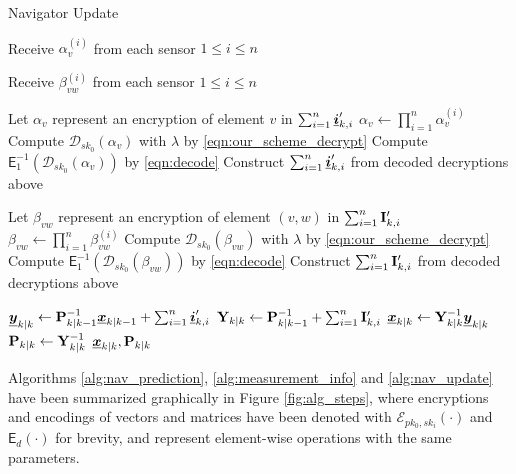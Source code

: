 \documentclass[10pt,letterpaper,oneside,twocolumn,journal]{IEEEtran}
\theoremstyle{definition}
\theoremstyle{definition}
\theoremstyle{remark}
\begin{document}
\begin{algorithm}[htbp]
\caption{Navigator Update}\label{alg:nav_update}
\begin{algorithmic}[1]
    
        \State Receive $\alpha_{v}^{(i)}$ from each sensor $1\leq i \leq n$
    \EndFor

        \State Receive $\beta_{vw}^{(i)}$ from each sensor $1\leq i \leq n$
        \EndFor
    \EndFor

    \State Let $\alpha_{v}$ represent an encryption of element $v$ in $\sum_{i=1}^n{\boldsymbol{\underline{i}}}'_{k,i}$
        \State $\alpha_{v} \gets \prod_{i=1}^n\alpha_{v}^{(i)}$
        \State Compute $\mathcal{D}_{sk_0}(\alpha_{v})$ with $\lambda$ by \eqref{eqn:our_scheme_decrypt}
        \State Compute $\mathsf{E}^{-1}_{1}(\mathcal{D}_{sk_0}(\alpha_{v}))$ by \eqref{eqn:decode}
    \EndFor
    \State Construct $\sum_{i=1}^n{\boldsymbol{\underline{i}}}'_{k,i}$ from decoded decryptions above

    \State Let $\beta_{vw}$ represent an encryption of element $(v,w)$ in $\sum_{i=1}^n{{\mathbf{I}}}'_{k,i}$
            \State $\beta_{vw} \gets \prod_{i=1}^n\beta_{vw}^{(i)}$
            \State Compute $\mathcal{D}_{sk_0}(\beta_{vw})$ with $\lambda$ by \eqref{eqn:our_scheme_decrypt}
            \State Compute $\mathsf{E}^{-1}_{1}(\mathcal{D}_{sk_0}(\beta_{vw}))$ by \eqref{eqn:decode}
        \EndFor
    \EndFor
    \State Construct $\sum_{i=1}^n{{\mathbf{I}}}'_{k,i}$ from decoded decryptions above

    \State ${\boldsymbol{\underline{y}}}_{k|k} \gets {\ensuremath{{\mathbf{P}}}}_{k|k-1}^{-1}{\boldsymbol{\underline{x}}}_{k|k-1} + \sum_{i=1}^n{\boldsymbol{\underline{i}}}'_{k,i}$
    \State ${{\mathbf{Y}}}_{k|k} \gets {\ensuremath{{\mathbf{P}}}}_{k|k-1}^{-1} + \sum_{i=1}^n{{\mathbf{I}}}'_{k,i}$
    \State ${\boldsymbol{\underline{x}}}_{k|k} \gets {\ensuremath{{\mathbf{Y}}}}_{k|k}^{-1}{\boldsymbol{\underline{y}}}_{k|k}$
    \State ${{\mathbf{P}}}_{k|k} \gets {\ensuremath{{\mathbf{Y}}}}_{k|k}^{-1}$
    \State \Return ${\boldsymbol{\underline{x}}}_{k|k}, {{\mathbf{P}}}_{k|k}$
    \EndProcedure
\end{algorithmic}
\end{algorithm}

Algorithms \ref{alg:nav_prediction}, \ref{alg:measurement_info} and \ref{alg:nav_update} have been summarized graphically in Figure \ref{fig:alg_steps}, where encryptions and encodings of vectors and matrices have been denoted with $\mathcal{E}_{pk_0,sk_i}(\cdot)$ and $\mathsf{E}_d(\cdot)$ for brevity, and represent element-wise operations with the same parameters.
\end{document}
